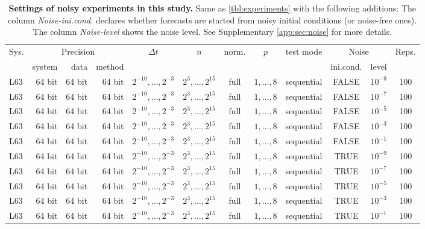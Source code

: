 \documentclass{article}
\newcommand{\stepsize}{\Delta\!t}
\begin{document}
\begin{table}[t!]
	\begin{center}
		\fontsize{8.0pt}{10pt}\selectfont
		\selectfont
		\renewcommand{\arraystretch}{1.05}
		\setlength{\tabcolsep}{0.5em}
		\begin{tabular}{lrrrcccccccc}
			\toprule
			Sys. & \multicolumn{3}{c}{Precision} & $\stepsize$ & $n$ & norm. & $p$ & test mode & \multicolumn{2}{c}{Noise} & Reps.\\
			\cmidrule(lr){2-4}
			& system & data & method & & & & & & ini.cond. & level & \\
			\midrule
			L63 & 64 bit & 64 bit & 64 bit & $2^{-10}, \dots, 2^{-3}$ & $2^3, \dots, 2^{15}$ & full & $1, \dots, 8$ & sequential & FALSE & $10^{-9}$ & 100\\
			L63 & 64 bit & 64 bit & 64 bit & $2^{-10}, \dots, 2^{-3}$ & $2^3, \dots, 2^{15}$ & full & $1, \dots, 8$ & sequential & FALSE & $10^{-7}$ & 100\\
			L63 & 64 bit & 64 bit & 64 bit & $2^{-10}, \dots, 2^{-3}$ & $2^3, \dots, 2^{15}$ & full & $1, \dots, 8$ & sequential & FALSE & $10^{-5}$ & 100\\
			L63 & 64 bit & 64 bit & 64 bit & $2^{-10}, \dots, 2^{-3}$ & $2^3, \dots, 2^{15}$ & full & $1, \dots, 8$ & sequential & FALSE & $10^{-3}$ & 100\\
			L63 & 64 bit & 64 bit & 64 bit & $2^{-10}, \dots, 2^{-3}$ & $2^3, \dots, 2^{15}$ & full & $1, \dots, 8$ & sequential & FALSE & $10^{-1}$ & 100\\
			L63 & 64 bit & 64 bit & 64 bit & $2^{-10}, \dots, 2^{-3}$ & $2^3, \dots, 2^{15}$ & full & $1, \dots, 8$ & sequential & TRUE & $10^{-9}$ & 100\\
			L63 & 64 bit & 64 bit & 64 bit & $2^{-10}, \dots, 2^{-3}$ & $2^3, \dots, 2^{15}$ & full & $1, \dots, 8$ & sequential & TRUE & $10^{-7}$ & 100\\
			L63 & 64 bit & 64 bit & 64 bit & $2^{-10}, \dots, 2^{-3}$ & $2^3, \dots, 2^{15}$ & full & $1, \dots, 8$ & sequential & TRUE & $10^{-5}$ & 100\\
			L63 & 64 bit & 64 bit & 64 bit & $2^{-10}, \dots, 2^{-3}$ & $2^3, \dots, 2^{15}$ & full & $1, \dots, 8$ & sequential & TRUE & $10^{-3}$ & 100\\
			L63 & 64 bit & 64 bit & 64 bit & $2^{-10}, \dots, 2^{-3}$ & $2^3, \dots, 2^{15}$ & full & $1, \dots, 8$ & sequential & TRUE & $10^{-1}$ & 100\\
			\bottomrule
		\end{tabular}
	\end{center}
	\caption{\textbf{Settings of noisy experiments in this study.} Same as \cref{tbl:experiments} with the following additions: The column \textit{Noise-ini.cond.} declares whether forecasts are started from noisy initial conditions (or noise-free ones). The column \textit{Noise-level} shows the noise level. See Supplementary \cref{app:sec:noise} for more details.}
	\label{tbl:experiments:noisy}
\end{table}
\end{document}
